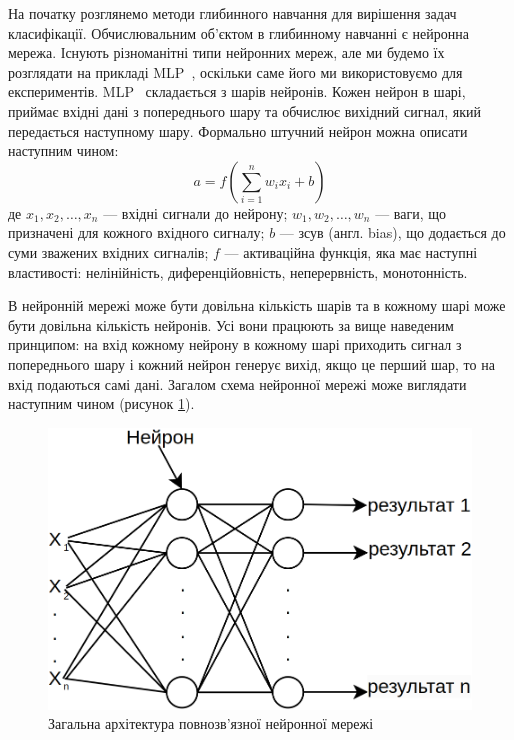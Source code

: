 На початку розглянемо методи глибинного навчання для вирішення задач класифікації. Обчислювальним об'єктом в глибинному навчанні є нейронна мережа. Існують різноманітні типи нейронних мереж, але ми будемо їх розглядати на прикладі MLP~\cite{ct26}, оскільки саме його ми використовуємо для експериментів. MLP~\cite{ct26} складається з шарів нейронів. Кожен нейрон в шарі, приймає вхідні дані з попереднього шару та обчислює вихідний сигнал, який передається наступному шару. Формально штучний нейрон можна описати наступним чином:
\begin{equation}
\label{eq:neuron}
	a = f\left(\sum_{i=1}^n w_i x_i + b \right)
\end{equation}
де \(x_1, x_2, \ldots, x_n\) — вхідні сигнали до нейрону; \(w_1, w_2, \ldots, w_n\) — ваги, що призначені для кожного вхідного сигналу; \(b\) — зсув (англ. bias), що додається до суми зважених вхідних сигналів; \(f\) — активаційна функція, яка має наступні властивості: нелінійність, диференційовність, неперервність, монотонність. 

В нейронній мережі може бути довільна кількість шарів та в кожному шарі може бути довільна кількість нейронів. Усі вони працюють за вище наведеним принципом: на вхід кожному нейрону в кожному шарі приходить сигнал з попереднього шару і кожний нейрон генерує вихід, якщо це перший шар, то на вхід подаються самі дані. Загалом схема нейронної мережі може виглядати наступним чином (рисунок \ref{fig_nn_arch}).

\begin{figure}[ht]
	\centering
	\includegraphics[scale=0.5]{Images/neural_network_architecture.png}
	\caption{Загальна архітектура повнозв'язної нейронної мережі}
	\label{fig_nn_arch}
\end{figure}

